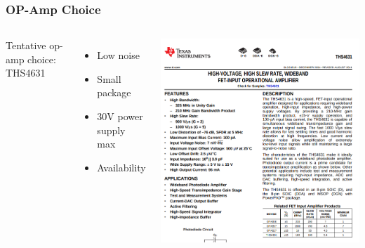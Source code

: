 \documentclass{beamer}
\begin{document}
\begin{frame}
  \frametitle{OP-Amp Choice}

  \begin{columns}
  \scriptsize
  Tentative op-amp choice:  THS4631
    \begin{itemize}
    \scriptsize
    \item Low noise
    \item Small package
    \item 30V power supply max
    \item Availability
    \end{itemize}

  \includegraphics[width=\textwidth]{figs/ths4631-data.png}

  \end{columns}







\end{frame}
\end{document}
